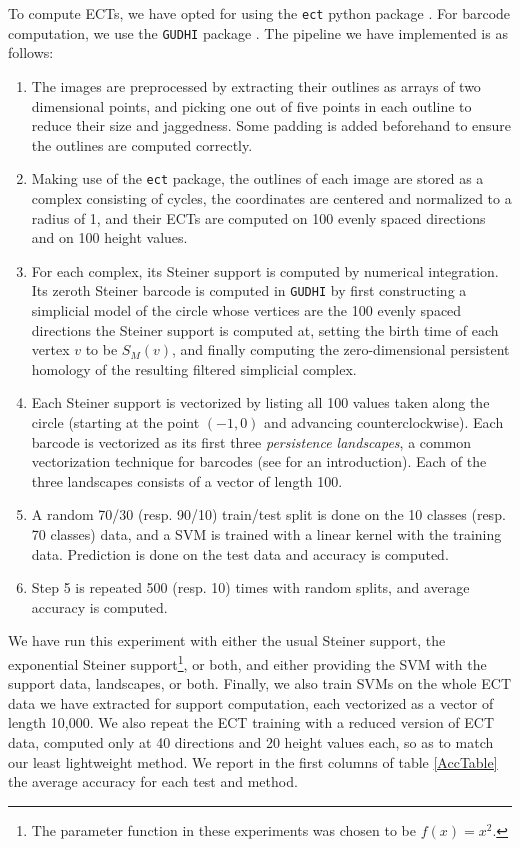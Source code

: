 \documentclass[a4paper]{article}
\begin{document}
To compute ECTs, we have opted for using the \texttt{ect} python package \cite{ayub_ect_2026}. For barcode computation, we use the \texttt{GUDHI} package \cite{gudhi:urm}.
The pipeline we have implemented is as follows:

\begin{enumerate}
	\item The images are preprocessed by extracting their outlines as arrays of two dimensional points, and picking one out of five points in each outline to reduce their size and jaggedness. Some padding is added beforehand to ensure the outlines are computed correctly.
	\item Making use of the \texttt{ect} package, the outlines of each image are stored as a complex consisting of cycles, the coordinates are centered and normalized to a radius of 1, and their ECTs are computed on 100 evenly spaced directions and on 100 height values.
	\item For each complex, its Steiner support is computed by numerical integration. Its zeroth Steiner barcode is computed in \texttt{GUDHI} by first constructing a simplicial model of the circle whose vertices are the 100 evenly spaced directions the Steiner support is computed at, setting the birth time of each vertex $v$ to be $S_M(v)$, and finally computing the zero-dimensional persistent homology of the resulting filtered simplicial complex.
	\item Each Steiner support is vectorized by listing all 100 values taken along the circle (starting at the point $(-1,0)$ and advancing counterclockwise). Each barcode is vectorized as its first three \emph{persistence landscapes}, a common vectorization technique for barcodes (see \cite{bubenik2020persistence} for an introduction). Each of the three landscapes consists of a vector of length 100.
	\item A random 70/30 (resp. 90/10) train/test split is done on the 10 classes (resp. 70 classes) data, and a SVM is trained with a linear kernel with the training data. Prediction is done on the test data and accuracy is computed.
	\item Step 5 is repeated 500 (resp. 10) times with random splits, and average accuracy is computed.
\end{enumerate}

We have run this experiment with either the usual Steiner support, the exponential Steiner support\footnote{The parameter function in these experiments was chosen to be $f(x)=x^2$.}, or both, and either providing the SVM with the support data, landscapes, or both. Finally, we also train SVMs on the whole ECT data we have extracted for support computation, each vectorized as a vector of length 10,000. We also repeat the ECT training with a reduced version of ECT data, computed only at 40 directions and 20 height values each, so as to match our least lightweight method. We report in the first columns of table \ref{AccTable} the average accuracy for each test and method.
\end{document}
